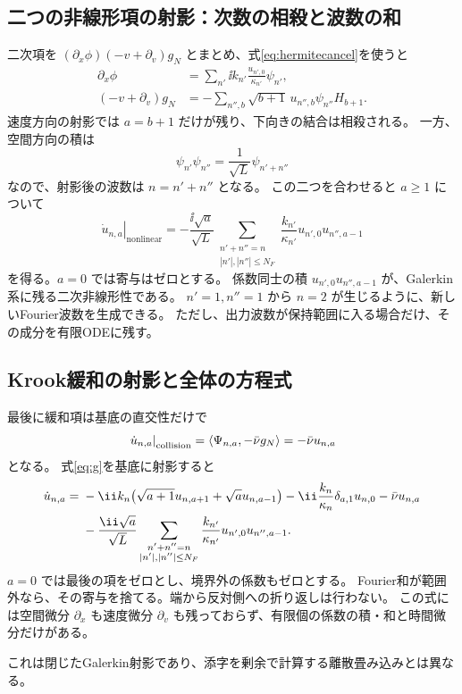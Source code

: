 \subsection{二つの非線形項の射影：次数の相殺と波数の和}
二次項を $(\partial_x\phi)(-v+\partial_v)g_N$ とまとめ、式\eqref{eq:hermitecancel}を使うと
\begin{align*}
\partial_x\phi&=\sum_{n'}\ii k_{n'}\frac{u_{n',0}}{\kappa_{n'}}\psi_{n'},\\
(-v+\partial_v)g_N&=-\sum_{n'',b}\sqrt{b+1}\,u_{n'',b}\psi_{n''}H_{b+1}.
\end{align*}
速度方向の射影では $a=b+1$ だけが残り、下向きの結合は相殺される。
一方、空間方向の積は
\[
\boxed{\psi_{n'}\psi_{n''}=\frac1{\sqrt L}\psi_{n'+n''}}
\]
なので、射影後の波数は $n=n'+n''$ となる。
この二つを合わせると $a\geq1$ について
\[
\boxed{\left.\dot u_{n,a}\right|_{\mathrm{nonlinear}}
=-\frac{\ii\sqrt a}{\sqrt L}
\sum_{\substack{n'+n''=n\\|n'|,|n''|\leq N_F}}
\frac{k_{n'}}{\kappa_{n'}}u_{n',0}u_{n'',a-1}}
\]
を得る。$a=0$ では寄与はゼロとする。
係数同士の積 $u_{n',0}u_{n'',a-1}$ が、Galerkin系に残る二次非線形性である。
$n'=1,n''=1$ から $n=2$ が生じるように、新しいFourier波数を生成できる。
ただし、出力波数が保持範囲に入る場合だけ、その成分を有限ODEに残す。

\subsection{Krook緩和の射影と全体の方程式}
最後に緩和項は基底の直交性だけで
\[
\left.\dot u_{n,a}\right|_{\mathrm{collision}}
=\langle\Psi_{n,a},-\bar\nu g_N\rangle=-\bar\nu u_{n,a}
\]
となる。
式\eqref{eq:g}を基底に射影すると
\begin{align}
\dot u_{n,a}={}&-\ii k_n\bigl(\sqrt{a+1}u_{n,a+1}+\sqrt a u_{n,a-1}\bigr)
-\ii\frac{k_n}{\kappa_n}\delta_{a,1}u_{n,0}-\nuu u_{n,a}\notag\\
&-\frac{\ii\sqrt a}{\sqrt L}
\sum_{\substack{n'+n''=n\\|n'|,|n''|\leq N_F}}
\frac{k_{n'}}{\kappa_{n'}}u_{n',0}u_{n'',a-1}.
\label{eq:galerkin}
\end{align}
$a=0$ では最後の項をゼロとし、境界外の係数もゼロとする。
Fourier和が範囲外なら、その寄与を捨てる。端から反対側への折り返しは行わない。
この式には空間微分 $\partial_x$ も速度微分 $\partial_v$ も残っておらず、有限個の係数の積・和と時間微分だけがある。

これは閉じたGalerkin射影であり、添字を剰余で計算する離散畳み込みとは異なる。

